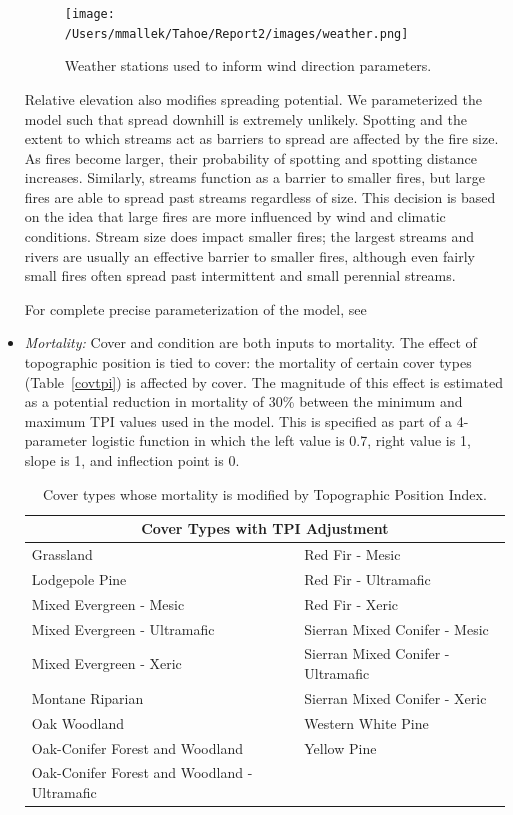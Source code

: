 \begin{itemize}
\begin{figure}[htbp]
\centering
\texttt{[image: /Users/mmallek/Tahoe/Report2/images/weather.png]}
\caption{Weather stations used to inform wind direction parameters.}
\label{weather}
\end{figure}

Relative elevation also modifies spreading potential. We parameterized the model such that spread downhill is extremely unlikely. Spotting and the extent to which streams act as barriers to spread are affected by the fire size. As fires become larger, their probability of spotting and spotting distance increases. Similarly, streams function as a barrier to smaller fires, but large fires are able to spread past streams regardless of size. This decision is based on the idea that large fires are more influenced by wind and climatic conditions. Stream size does impact smaller fires; the largest streams and rivers are usually an effective barrier to smaller fires, although even fairly small fires often spread past intermittent and small perennial streams. 

For complete precise parameterization of the model, see 


\item \emph{Mortality:} Cover and condition are both inputs to mortality. The effect of topographic position is tied to cover: the mortality of certain cover types (Table~\ref{covtpi}) is affected by cover. The magnitude of this effect is estimated as a potential reduction in mortality of 30\% between the minimum and maximum TPI values used in the model. This is specified as part of a 4-parameter logistic function in which the left value is 0.7, right value is 1, slope is 1, and inflection point is 0. 

\begin{table}[htbp]
\small
\centering
\caption{Cover types whose mortality is modified by Topographic Position Index.}
\begin{tabular}{ll}
\hline
\multicolumn{2}{c}{\textbf{Cover Types with TPI Adjustment}} \\
\hline
Grassland     									& Red Fir - Mesic   					\\
Lodgepole Pine    								& Red Fir - Ultramafic					\\
Mixed Evergreen - Mesic							& Red Fir - Xeric    					\\
Mixed Evergreen - Ultramafic     				& Sierran Mixed Conifer - Mesic    		\\
Mixed Evergreen - Xeric 						& Sierran Mixed Conifer - Ultramafic 	\\
Montane Riparian								& Sierran Mixed Conifer - Xeric 		\\
Oak Woodland 									& Western White Pine					\\
Oak-Conifer Forest and Woodland 				& Yellow Pine 							\\
Oak-Conifer Forest and Woodland - Ultramafic 	&										\\
\hline
\end{tabular}
\end{table}


\end{itemize}
